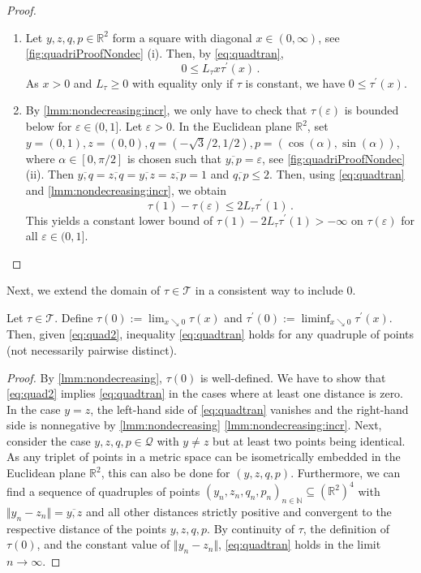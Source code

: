 \documentclass{article}
\renewcommand{\subset}{\subseteq}
\newcommand*{\mc}[1]{\mathcal{#1}}
\newcommand{\N}{\mathbb{N}}
\newcommand{\R}{\mathbb{R}}
\newcommand{\Rpp}{(0, \infty)} %
\newcommand{\pr}{^\prime}
\newcommand{\normof}[1]{\Vert #1 \Vert}
\newcommand{\equationFullstop}{\, .}
\newcommand{\eqfs}{\equationFullstop}
\newcommand{\ol}[2]{\overline{#1,#2}}
\newcommand{\tran}{\tau}
\newcommand{\Tran}{\mc{T}}
\newcommand{\dtran}{\tran\pr}
\newcommand{\ctransymbol}{L}
\newcommand{\ctrano}[1]{\ctransymbol_{#1}}
\newcommand{\ctran}{\ctrano{\tran}}
\begin{document}
%
\begin{proof}
	\begin{enumerate}[label=(\roman*)]
		\item 
			Let $y,z,q,p\in\R^2$ form a square with diagonal $x\in\Rpp$, see \cref{fig:quadriProofNondec} (i). Then, by \eqref{eq:quadtran},
			\begin{equation}
				0 \leq \ctran x \dtran(x)\eqfs
			\end{equation}
			As $x>0$ and $\ctran \geq 0$ with equality only if $\tran$ is constant, we have $0 \leq \dtran(x)$.
		\item 
			By \ref{lmm:nondecreasing:incr}, we only have to check that $\tran(\varepsilon)$ is bounded below for $\varepsilon\in(0,1]$. Let $\varepsilon>0$. In the Euclidean plane $\R^2$, set $y = (0,1), z = (0,0), q = (-\sqrt{3}/2, 1/2), p = (\cos(\alpha), \sin(\alpha))$, where $\alpha\in[0,\pi/2]$ is chosen such that $\ol yp = \varepsilon$, see \cref{fig:quadriProofNondec} (ii). Then $\ol yq = \ol zq = \ol yz = \ol zp = 1$ and $\ol qp \leq 2$. Then, using \eqref{eq:quadtran} and \ref{lmm:nondecreasing:incr}, we obtain
			\begin{equation}
				\tran(1) - \tran(\varepsilon) \leq 2 \ctran \dtran(1)\eqfs
			\end{equation}
			This yields a constant lower bound of $\tran(1) - 2 \ctran \dtran(1) > -\infty$ on $\tran(\varepsilon)$ for all $\varepsilon\in(0,1]$.
	\end{enumerate}
\end{proof}
%
Next, we extend the domain of $\tran\in\Tran$ in a consistent way to include $0$.
\begin{proposition}
	Let $\tran\in\Tran$. Define $\tran(0) := \lim_{x\searrow0} \tran(x)$ and $\dtran(0) := \liminf_{x\searrow0} \dtran(x)$. Then, given \eqref{eq:quad2}, inequality \eqref{eq:quadtran} holds for any quadruple of points (not necessarily pairwise distinct).
\end{proposition} 
%
\begin{proof}
	By \cref{lmm:nondecreasing}, $\tran(0)$ is well-defined. We have to show that \eqref{eq:quad2} implies \eqref{eq:quadtran} in the cases where at least one distance is zero. In the case $y=z$, the left-hand side of \eqref{eq:quadtran} vanishes and the right-hand side is nonnegative by \cref{lmm:nondecreasing} \ref{lmm:nondecreasing:incr}. Next, consider the case $y,z,q,p\in\mc Q$ with $y\neq z$ but at least two points being identical. As any triplet of points in a metric space can be isometrically embedded in the Euclidean plane $\R^2$, this can also be done for $(y,z,q,p)$. Furthermore, we can find a sequence of quadruples of points $(y_n, z_n, q_n, p_n)_{n\in\N} \subset (\R^2)^4$ with $\normof{y_n - z_n} = \ol yz$ and all other distances strictly positive and convergent to the respective distance of the points $y,z,q,p$. By continuity of $\tran$, the definition of $\tran(0)$, and the constant value of $\normof{y_n - z_n}$, \eqref{eq:quadtran} holds in the limit $n\to\infty$.
\end{proof}
\end{document}

